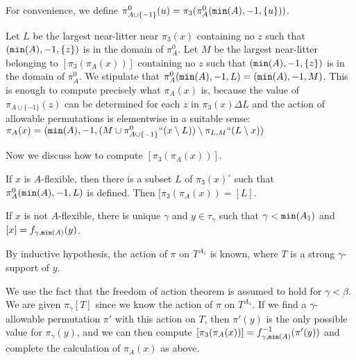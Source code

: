 \documentclass[112pt]{article}
\begin{document}
\begin{description}
For convenience, we define $\pi^0_{A \cup \{-1\}}(u) = \pi_3(\pi^0_A({\tt min}(A),-1,\{u\}))$.

Let $L$ be the largest near-litter near $\pi_3(x)$ containing no $z$ such that $({\tt min}(A),-1,\{z\})$ is in the domain of $\pi^0_A$.
Let $M$ be the largest  near-litter belonging to $[\pi_3(\pi_A(x))]$ containing no $z$ such that $({\tt min}(A),-1,\{z\})$ is in the domain of $\pi^0_A$.
We stipulate that $\pi^0_A({\tt min}(A),-1,L) = ({\tt min}(A),-1,M)$.  This is enough to compute precisely what $\pi_A(x)$ is, because
the value of $\pi_{A \cup \{-1\}}(z)$ can be determined for each $z$ in $\pi_3(x) \Delta L$ and the action of allowable permutations is elementwise in a suitable sense:  $\pi_A(x) = ({\tt min}(A),-1,(M \cup \pi^0_{A \cup \{-1\}}``(x \setminus L)) \setminus \pi_{L,M}``(L\setminus x))$

Now we discuss how to compute $[\pi_3(\pi_A(x))]$.

If $x$ is $A$-flexible, then there is a subset $L$ of $\pi_3(x)^\circ$ such that $\pi^0_A({\tt min}(A),-1,L)$ is defined.  Then $[\pi_3(\pi_A(x))=[L]$.

If $x$ is not $A$-flexible, there is unique $\gamma$ and $y \in \tau_\gamma$ such that $\gamma < {\tt min}(A_1)$ and $[x] = f_{\gamma,{\tt min}(A)}(y)$.

By inductive hypothesis, the action of $\pi$ on $T^{A_1}$ is known, where $T$ is a strong $\gamma$-support of $y$.

We use the fact that the freedom of action theorem is assumed to hold for $\gamma<\beta$.  We are given $\pi_\gamma[T]$ since we know the action
of $\pi$ on $T^{A_1}$.  If we find a $\gamma$-allowable permutation $\pi'$ with this action on $T$, then $\pi'(y)$ is the only possible value for
$\pi_\gamma(y)$, and we can then compute $[\pi_3(\pi_A(x))]=f_{\gamma,{\tt min}(A)}^{-1}(\pi'(y))$ and complete the calculation of $\pi_A(x)$ as above.


\end{description}
\end{document}
